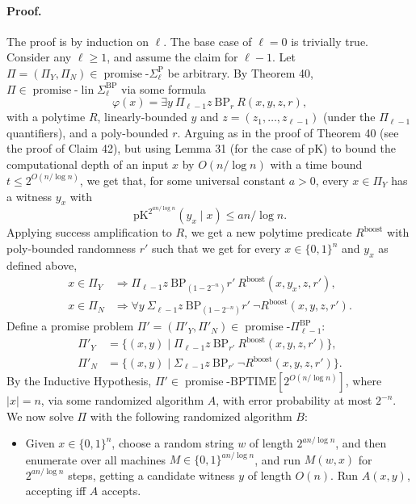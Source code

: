 \paragraph{Proof.} The proof is by induction on $\ell$. The base case of $\ell=0$ is trivially true. Consider any $\ell\geq1$, and assume the claim for $\ell-1$. Let $\Pi=(\Pi_Y,\Pi_N)\in\operatorname{promise}\text{-}\Sigma_\ell^{\mathrm P}$ be arbitrary. By Theorem 40, $\Pi\in\operatorname{promise}\text{-}\operatorname{lin}\Sigma_\ell^{\mathrm{BP}}$ via some formula
\[\varphi(x)=\exists y\ \Pi_{\ell-1}z\ \mathrm{BP}_r\ R(x,y,z,r),\]
with a polytime $R$, linearly-bounded $y$ and $z=(z_1,\ldots,z_{\ell-1})$ (under the $\Pi_{\ell-1}$ quantifiers), and a poly-bounded $r$.
Arguing as in the proof of Theorem 40 (see the proof of Claim 42), but using Lemma 31 (for the case of pK) to bound the computational depth of an input $x$ by $O(n/\log n)$ with a time bound $t\leq2^{O(n/\log n)}$, we get that, for some universal constant $a>0$, every $x\in\Pi_Y$ has a witness $y_x$ with
\[\mathrm{pK}^{2^{an/\log n}}(y_x\mid x)\leq an/\log n.\tag{27}\]
Applying success amplification to $R$, we get a new polytime predicate $R^{\mathrm{boost}}$ with poly-bounded randomness $r'$ such that we get for every $x\in\{0,1\}^n$ and $y_x$ as defined above,
\begin{align*}
x\in\Pi_Y&\Longrightarrow\Pi_{\ell-1}z\ \mathrm{BP}_{(1-2^{-n})}r'\ R^{\mathrm{boost}}(x,y_x,z,r'),\tag{28}\\
x\in\Pi_N&\Longrightarrow\forall y\ \Sigma_{\ell-1}z\ \mathrm{BP}_{(1-2^{-n})}r'\ \neg R^{\mathrm{boost}}(x,y,z,r').\tag{29}
\end{align*}
Define a promise problem $\Pi'=(\Pi'_Y,\Pi'_N)\in\operatorname{promise}\text{-}\Pi_{\ell-1}^{\mathrm{BP}}$:
\begin{align*}
\Pi'_Y&=\{(x,y)\mid\Pi_{\ell-1}z\ \mathrm{BP}_{r'}\ R^{\mathrm{boost}}(x,y,z,r')\},\\
\Pi'_N&=\{(x,y)\mid\Sigma_{\ell-1}z\ \mathrm{BP}_{r'}\ \neg R^{\mathrm{boost}}(x,y,z,r')\}.
\end{align*}
By the Inductive Hypothesis, $\Pi'\in\operatorname{promise}\text{-}\mathrm{BPTIME}[2^{O(n/\log n)}]$, where $|x|=n$, via some randomized algorithm $A$, with error probability at most $2^{-n}$.
We now solve $\Pi$ with the following randomized algorithm $B$:
\begin{itemize}
\item Given $x\in\{0,1\}^n$, choose a random string $w$ of length $2^{an/\log n}$, and then enumerate over all machines $M\in\{0,1\}^{an/\log n}$, and run $M(w,x)$ for $2^{an/\log n}$ steps, getting a candidate witness $y$ of length $O(n)$. Run $A(x,y)$, accepting iff $A$ accepts.
\end{itemize}
